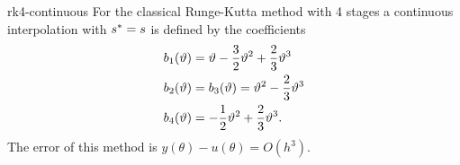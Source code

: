 \begin{Example}{rk4-continuous}
  For the classical Runge-Kutta method with 4 stages a continuous
  interpolation with $s^* = s$ is defined by the coefficients
  \begin{equation*}
    \begin{split}
      b_1(\vartheta) & = \vartheta - \frac32 \vartheta^2 + \frac23 \vartheta^3 \\
      b_2(\vartheta) & = b_3(\vartheta) = \vartheta^2 - \frac23 \vartheta^3 \\
      b_4(\vartheta) & = - \frac12 \vartheta^2 + \frac23 \vartheta^3. \\
    \end{split}
  \end{equation*}
  The error of this method is $y(\theta) - u(\theta) = O(h^3)$.
\end{Example}

